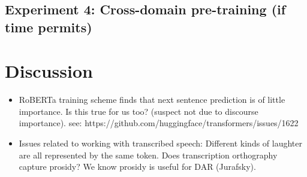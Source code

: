 \documentclass[11pt,a4paper]{article}
\begin{document}
\subsection{Experiment 4: Cross-domain pre-training (if time permits)} \label{sec:experiment4} %

\section{Discussion} %
\begin{itemize}
  \item RoBERTa training scheme finds that next sentence prediction is of little importance. Is this true for us too? (suspect not due to discourse importance). see: https://github.com/huggingface/transformers/issues/1622
  \item Issues related to working with transcribed speech: Different kinds of laughter are all represented by the same token. Does transcription orthography capture prosidy? We know prosidy is useful for DAR (Jurafsky).
\end{itemize}



\end{document}
